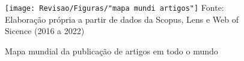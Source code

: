 \begin{figure}[H]
	\centering
	\caption{Mapa mundial da publicação de artigos em todo o mundo}
	\label{fig:mapa-mundi-artigos}
	\texttt{[image: Revisao/Figuras/"mapa mundi artigos"]}
	\vspace{0.2cm}
	Fonte: Elaboração própria a partir de dados da Scopus, Lens e Web of Sicence (2016 a 2022)
\end{figure}